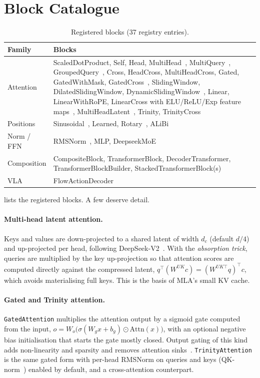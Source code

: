 \documentclass[11pt]{article}
\begin{document}
\section{Block Catalogue}

\begin{table}[t]
\centering
\caption{Registered blocks (37 registry entries).}
\label{tab:catalogue}
\small
\begin{tabular}{lp{10.4cm}}
\toprule
Family & Blocks \\
\midrule
Attention & ScaledDotProduct, Self, Head, MultiHead~\cite{vaswani2017attention}, MultiQuery~\cite{shazeer2019mqa}, GroupedQuery~\cite{ainslie2023gqa}, Cross, HeadCross, MultiHeadCross, Gated, GatedWithMask, GatedCross~\cite{qiu2025gated}, SlidingWindow, DilatedSlidingWindow, DynamicSlidingWindow~\cite{beltagy2020longformer}, Linear, LinearWithRoPE, LinearCross with ELU/ReLU/Exp feature maps~\cite{katharopoulos2020linear}, MultiHeadLatent~\cite{deepseekv2}, Trinity, TrinityCross \\
Positions & Sinusoidal~\cite{vaswani2017attention}, Learned, Rotary~\cite{su2021roformer}, ALiBi~\cite{press2022alibi} \\
Norm / FFN & RMSNorm~\cite{zhang2019rmsnorm}, MLP, DeepseekMoE~\cite{dai2024deepseekmoe} \\
Composition & CompositeBlock, TransformerBlock, DecoderTransformer, TransformerBlockBuilder, StackedTransformerBlock(s) \\
VLA & FlowActionDecoder~\cite{lipman2023flow,black2024pi0} \\
\bottomrule
\end{tabular}
\end{table}

 lists the registered blocks. A few deserve detail.

\paragraph{Multi-head latent attention.} Keys and values are down-projected to a shared latent of
width $d_c$ (default $d/4$) and up-projected per head, following DeepSeek-V2~\cite{deepseekv2}.
With the \emph{absorption trick}, queries are multiplied by the key up-projection so that
attention scores are computed directly against the compressed latent,
$q^\top (W^{UK} c) = (W^{UK\top} q)^\top c$, which avoids materialising full keys. This is the
basis of MLA's small KV cache.

\paragraph{Gated and Trinity attention.} \texttt{GatedAttention} multiplies the attention output
by a sigmoid gate computed from the input, $o = W_o\big(\sigma(W_g x + b_g)\odot \mathrm{Attn}(x)\big)$,
with an optional negative bias initialisation that starts the gate mostly closed. Output
gating of this kind adds non-linearity and sparsity and removes attention sinks~\cite{qiu2025gated}.
\texttt{TrinityAttention} is the same gated form with per-head RMSNorm on queries and keys
(QK-norm~\cite{henry2020qknorm}) enabled by default, and a cross-attention counterpart.
\end{document}
